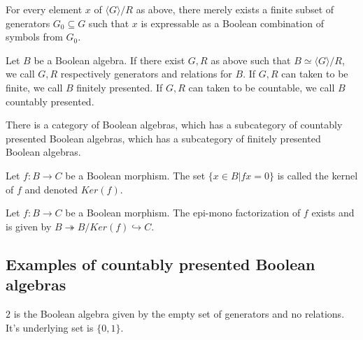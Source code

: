 \documentclass{../util/zariski-small}
\begin{document}
\begin{remark}
  For every element $x$ of $\langle G\rangle /R$ as above,
  there merely exists a finite subset of generators $G_0\subseteq G$ such that $x$ is expressable 
  as a Boolean combination of symbols from $G_0$. 
\end{remark}
\begin{definition}
  Let $B$ be a Boolean algebra. 
  If there exist $G, R$ as above such that 
  $B \simeq \langle G \rangle /R$, 
  we call $G,R$ respectively generators and relations for $B$. 
  If $G,R$ can taken to be finite, we call $B$ finitely presented. 
  If $G,R$ can taken to be countable, we call $B$ countably presented. 
\end{definition}
\begin{remark}
  There is a category of Boolean algebras, which has a subcategory of countably presented Boolean algebras, 
  which has a subcategory of finitely presented Boolean algebras. 
\end{remark}
\begin{definition}
  Let $f:B\to C$ be a Boolean morphism. 
  The set $\{x \in B| fx = 0\}$ is called the kernel of $f$ and denoted 
  $Ker(f)$. 
\end{definition}
\begin{remark}
  Let $f:B \to C$ be a Boolean morphism. 
  The epi-mono factorization of $f$ exists and is given by  
  $B \twoheadrightarrow B / Ker(f) \hookrightarrow C$.
\end{remark}


\subsection{Examples of countably presented Boolean algebras}
\begin{example}
  $2$ is the Boolean algebra given by the empty set of generators and no relations. 
    It's underlying set is $\{0,1\}$. 
\end{example}
\end{document}
